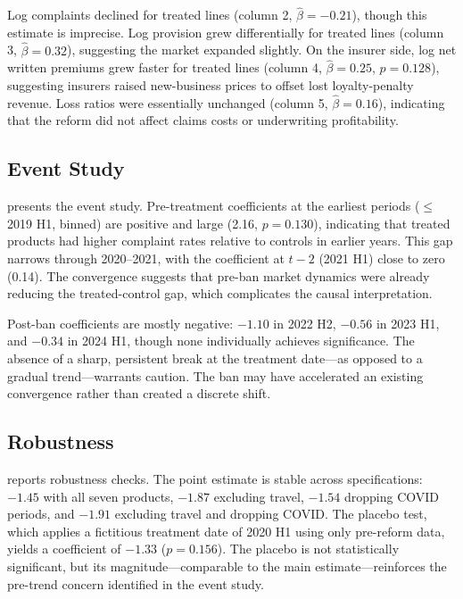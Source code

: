 \documentclass[12pt]{article}
\begin{document}
Log complaints declined for treated lines (column 2, $\hat{\beta} = -0.21$), though this estimate is imprecise. Log provision grew differentially for treated lines (column 3, $\hat{\beta} = 0.32$), suggesting the market expanded slightly. On the insurer side, log net written premiums grew faster for treated lines (column 4, $\hat{\beta} = 0.25$, $p = 0.128$), suggesting insurers raised new-business prices to offset lost loyalty-penalty revenue. Loss ratios were essentially unchanged (column 5, $\hat{\beta} = 0.16$), indicating that the reform did not affect claims costs or underwriting profitability.



\subsection{Event Study}

 presents the event study. Pre-treatment coefficients at the earliest periods ($\leq$2019 H1, binned) are positive and large (2.16, $p = 0.130$), indicating that treated products had higher complaint rates relative to controls in earlier years. This gap narrows through 2020--2021, with the coefficient at $t-2$ (2021 H1) close to zero (0.14). The convergence suggests that pre-ban market dynamics were already reducing the treated-control gap, which complicates the causal interpretation.

Post-ban coefficients are mostly negative: $-1.10$ in 2022 H2, $-0.56$ in 2023 H1, and $-0.34$ in 2024 H1, though none individually achieves significance. The absence of a sharp, persistent break at the treatment date---as opposed to a gradual trend---warrants caution. The ban may have accelerated an existing convergence rather than created a discrete shift.



\subsection{Robustness}

 reports robustness checks. The point estimate is stable across specifications: $-1.45$ with all seven products, $-1.87$ excluding travel, $-1.54$ dropping COVID periods, and $-1.91$ excluding travel and dropping COVID. The placebo test, which applies a fictitious treatment date of 2020 H1 using only pre-reform data, yields a coefficient of $-1.33$ ($p = 0.156$). The placebo is not statistically significant, but its magnitude---comparable to the main estimate---reinforces the pre-trend concern identified in the event study.
\end{document}
